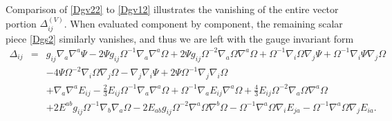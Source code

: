 \documentclass[10pt,letterpaper]{article}
\numberwithin{equation}{section}
\begin{document}
Comparison of \eqref{Dgv22} to \eqref{Dgv12} illustrates the vanishing of the entire vector portion $\Delta^{(V)}_{ij}$. When evaluated component by component, the remaining scalar piece \eqref{Dgs2} similarly vanishes, and thus we are left with the gauge invariant form
\begin{eqnarray}
\Delta_{ij}&=&g_{ij} \nabla_{a}\nabla^{a}\Psi
- 2 \Psi g_{ij} \Omega^{-1} \nabla_{a}\nabla^{a}\Omega
+ 2 \Psi g_{ij} \Omega^{-2} \nabla_{a}\Omega \nabla^{a}\Omega
+ \Omega^{-1} \nabla_{i}\Omega \nabla_{j}\Psi
+ \Omega^{-1} \nabla_{i}\Psi \nabla_{j}\Omega\nonumber\\
&& - 4 \Psi \Omega^{-2} \nabla_{i}\Omega \nabla_{j}\Omega
-  \nabla_{j}\nabla_{i}\Psi
+ 2 \Psi \Omega^{-1} \nabla_{j}\nabla_{i}\Omega
\nonumber\\
&&+\nabla_{a}\nabla^{a}E_{ij}
-  \tfrac{2}{3} E_{ij} \Omega^{-1} \nabla_{a}\nabla^{a}\Omega
+ \Omega^{-1} \nabla_{a}E_{ij} \nabla^{a}\Omega
+ \tfrac{4}{3} E_{ij} \Omega^{-2} \nabla_{a}\Omega \nabla^{a}\Omega\nonumber\\
&& + 2 E^{ab} g_{ij} \Omega^{-1} \nabla_{b}\nabla_{a}\Omega
- 2 E_{ab} g_{ij} \Omega^{-2} \nabla^{a}\Omega \nabla^{b}\Omega
-  \Omega^{-1} \nabla^{a}\Omega \nabla_{i}E_{ja}
-  \Omega^{-1} \nabla^{a}\Omega \nabla_{j}E_{ia}.
\label{Dgcf}
\end{eqnarray}
\end{document}
